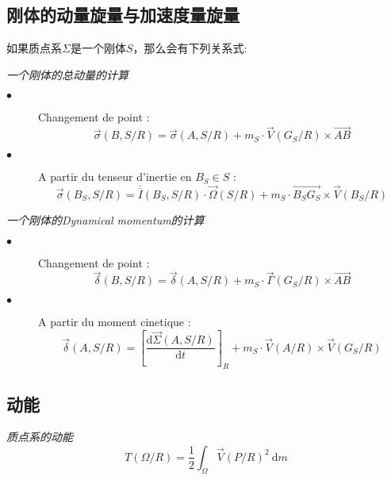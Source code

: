 \documentclass[UTF8]{ctexart}%
\begin{document}
\subsection{刚体的动量旋量与加速度量旋量}
\label{sec:刚体的动量旋量与加速度量旋量}
如果质点系$\Sigma$是一个刚体$S$，那么会有下列关系式:

\emph{一个刚体的总动量的计算}
\begin{description}
	\item[$\bullet$] Changement de point :
	\begin{equation}
	\overrightarrow{\sigma}\left(B,S/R\right)=\overrightarrow{\sigma}\left(A,S/R\right)+m_S\cdot \overrightarrow{V}\left(G_S/R\right)\times\overrightarrow{AB}
	\end{equation}
	\item[$\bullet$] A partir du tenseur d'inertie en $B_S\in S$ :
	\begin{equation}
	\overrightarrow{\sigma}\left(B_S,S/R\right)=\overline{\overline{I}}\left(B_S,S/R\right)\cdot \overrightarrow{\Omega}\left(S/R\right)+m_S\cdot \overrightarrow{B_S G_S}\times\overrightarrow{V}\left(B_S/R\right)
	\end{equation}
\end{description}

\emph{一个刚体的Dynamical momentum的计算}
\begin{description}
	\item[$\bullet$] Changement de point :
	\begin{equation}
	\overrightarrow{\delta}\left(B,S/R\right)=\overrightarrow{\delta}\left(A,S/R\right)+m_S\cdot \overrightarrow{\Gamma}\left(G_S/R\right)\times\overrightarrow{AB}
	\end{equation}
	\item[$\bullet$] A partir du moment cinetique :
	\begin{equation}
	\overrightarrow{\delta}\left(A,S/R\right)=\left[\frac{\mathrm{d}\overrightarrow{\Sigma}\left(A,S/R\right)}{\mathrm{d}t}\right]_R+m_S\cdot \overrightarrow{V}\left(A/R\right)\times\overrightarrow{V}\left(G_S/R\right)
	\end{equation}
\end{description}

\subsection{动能}
\label{sec:动能}

\emph{质点系的动能}
\begin{equation}
T\left(\Omega/R\right)=\frac{1}{2}\int_{\Omega}\overrightarrow{V}\left(P/R\right)^2\ \mathrm{d}m
\end{equation}
\end{document}

